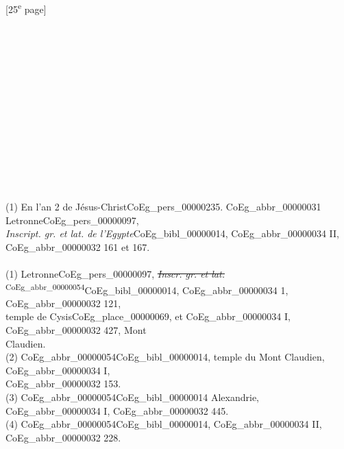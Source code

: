\documentclass{book}
\begin{document}
{{\footnotesize\begin{center} {[25\textsuperscript{e} page]}\end{center}}

\begin{paracol}{2}
\noindent \\
\\
\\
\\
\\
\\
\\
\\
\\
\\
\\
\\
\\
(1) En l’an 2 de Jésus-Christ\gls{CoEg_pers_00000235}. \Gls{CoEg_abbr_00000031} Letronne\gls{CoEg_pers_00000097},\\
\textit{Inscript. gr. et lat. de l’Egypte}\gls{CoEg_bibl_00000014}, \gls{CoEg_abbr_00000034} II,\\
\gls{CoEg_abbr_00000032} 161 et 167.\\
\\
(1) Letronne\gls{CoEg_pers_00000097}, \sout{\textit{Inscr. gr. et lat.}} \textsuperscript{\Gls{CoEg_abbr_00000054}}\gls{CoEg_bibl_00000014}, \gls{CoEg_abbr_00000034} 1, \gls{CoEg_abbr_00000032} 121,\\
temple de Cysis\gls{CoEg_place_00000069}, et \gls{CoEg_abbr_00000034} I, \gls{CoEg_abbr_00000032} 427, Mont\\
Claudien.\\
(2) \Gls{CoEg_abbr_00000054}\gls{CoEg_bibl_00000014}, temple du Mont Claudien, \gls{CoEg_abbr_00000034} I,\\
\gls{CoEg_abbr_00000032} 153.\\
(3) \Gls{CoEg_abbr_00000054}\gls{CoEg_bibl_00000014} Alexandrie, \gls{CoEg_abbr_00000034} I, \gls{CoEg_abbr_00000032} 445.\\
(4) \Gls{CoEg_abbr_00000054}\gls{CoEg_bibl_00000014}, \gls{CoEg_abbr_00000034} II, \gls{CoEg_abbr_00000032} 228.\\
\\
\\
\\
\\
\\
\\
\\
\\
\\

\end{paracol}}
\end{document}
